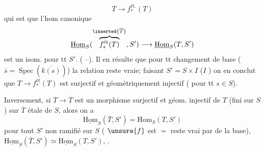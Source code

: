 \[
T\longrightarrow f_*^{\text{ét}.}(T)
\]
qui est  que l'hom canonique
\[
\underline{\mathrm{Hom}}_S(\overbrace{f_*^{\text{ét}}(T)}^{\inserted{\overline T}},S')\longrightarrow
\underline{\mathrm{Hom}}_S(T,S')
\]
est un isom. pour tt $S'$. ( --). Il en résulte que pour tt  changement de base
( $\bar s=\operatorname{Spec}(\overline{k(s)})$)
la  relation reste vraie; faisant $S'=S\times I$ ($I$ ) on en conclut que
$T\to f_*^{\text{ét}}(T)$ est surjectif et  géométriquement injectif
(    pour tt $s\in S$).

Inversement, si $T\to\overline T$ est un morphisme surjectif et géom. injectif de $T$ (fini  sur $S$) sur $\overline T$  étale de $S$, alors on a
\[
\underline{\mathrm{Hom}}_S(\overline T,S')=\mathrm{Hom}_S(T,S')
\]
pour tout $S'$ non ramifié sur $S$ ( $\unsure{f}$ est   $=$  reste vrai par  de la base),
 
$\underline{\mathrm{Hom}}_S(\overline T,S')\simeq\underline{\mathrm{Hom}}_S(T,S')$,
 .

